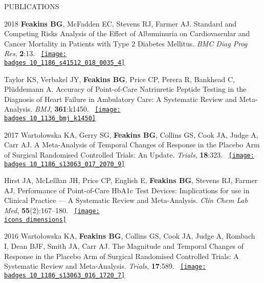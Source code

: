 \documentclass[10pt,a4paper]{article}
\def\badges{./badges/}
\def\icons{./icons/}
\begin{document}
\begin{cvlist}{PUBLICATIONS}
  \item[2018]
  \textbf{Feakins BG}, McFadden EC, Stevens RJ, Farmer AJ. Standard and Competing Risks Analysis of the Effect of Albuminuria on Cardiovascular and Cancer Mortality in Patients with Type 2 Diabetes Mellitus. \textit{BMC Diag Prog Res}, \textbf{2}:13. ~\href{https://biomedcentral.altmetric.com/details/45475518}{\texttt{[image: \\badges 10\_1186\_s41512\_018\_0035\_4]}}
  
  \item[]
  Taylor KS, Verbakel JY, \textbf{Feakins BG}, Price CP, Perera R, Bankhead C, Pl\"uddemann A. Accuracy of Point-of-Care Natriuretic Peptide Testing in the Diagnosis of Heart Failure in Ambulatory Care: A Systematic Review and Meta-Analysis. \textit{BMJ}, \textbf{361}:k1450. ~\href{https://bmj.altmetric.com/details/42193657}{\texttt{[image: \\badges 10\_1136\_bmj\_k1450]}}
  
  \item[2017]
  Warto\l{}owska KA, Gerry SG, \textbf{Feakins BG}, Collins GS, Cook JA, Judge A, Carr AJ. A Meta-Analysis of Temporal Changes of Response in the Placebo Arm of Surgical Randomised Controlled Trials: An Update. \textit{Trials}, \textbf{18}:323. ~\href{https://biomedcentral.altmetric.com/details/21804060}{\texttt{[image: \\badges 10\_1186\_s13063\_017\_2070\_9]}}
  
  \item[]
  Hirst JA, McLelllan JH, Price CP, English E, \textbf{Feakins BG}, Stevens RJ, Farmer AJ. Performance of Point-of-Care HbA1c Test Devices: Implications for use in Clinical Practice --- A Systematic Review and Meta-Analysis. \textit{Clin Chem Lab Med}, \textbf{55}(2):167--180. ~\href{https://badge.dimensions.ai/details/id/pub.1036082624}{\texttt{[image: \\icons dimensions]}}
  
  \item[2016]
  Warto\l{}owska KA, \textbf{Feakins BG}, Collins GS, Cook JA, Judge A, Rombach I, Dean BJF, Smith JA, Carr AJ. The Magnitude and Temporal Changes of Response in the Placebo Arm of Surgical Randomised Controlled Trials: A Systematic Review and Meta-Analysis. \textit{Trials}, \textbf{17}:589. ~\href{https://biomedcentral.altmetric.com/details/14679542}{\texttt{[image: \\badges 10\_1186\_s13063\_016\_1720\_7]}}
  

\end{cvlist}
\end{document}
